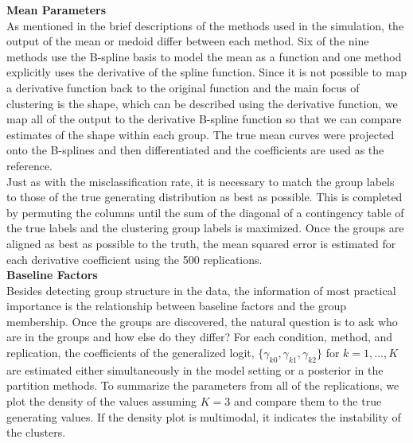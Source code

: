 \documentclass[12pt]{article}
\begin{document}
\textbf{Mean Parameters}\\
As mentioned in the brief descriptions of the methods used in the simulation, the output of the mean or medoid differ between each method. Six of the nine methods use the B-spline basis to model the mean as a function and one method explicitly uses the derivative of the spline function. Since it is not possible to map a derivative function back to the original function and the main focus of clustering is the shape, which can be described using the derivative function, we map all of the output to the derivative B-spline function so that we can compare estimates of the shape within each group. The true mean curves were projected onto the B-splines and then differentiated and the coefficients are used as the reference. \\
Just as with the misclassification rate, it is necessary to match the group labels to those of the true generating distribution as best as possible. This is completed by permuting the columns until the sum of the diagonal of a contingency table of the true labels and the clustering group labels is maximized. Once the groups are aligned as best as possible to the truth, the mean squared error is estimated for each derivative coefficient using the 500 replications.\\

\textbf{Baseline Factors}\\
Besides detecting group structure in the data, the information of most practical importance is the relationship between baseline factors and the group membership. Once the groups are discovered, the natural question is to ask who are in the groups and how else do they differ? For each condition, method, and replication, the coefficients of the generalized logit, $\{\gamma_{k0},\gamma_{k1},\gamma_{k2}\}$ for $k=1,...,K$ are estimated either simultaneously in the model setting or a posterior in the partition methods. To summarize the parameters from all of the replications, we plot the density of the values assuming $K=3$ and compare them to the true generating values. If the density plot is multimodal, it indicates the instability of the clusters. 
\end{document}
